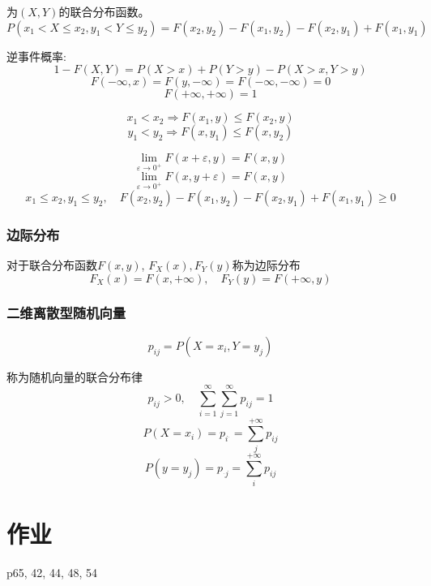 \documentclass[10pt, a4paper]{article}
\begin{document}
            为$(X, Y)$的联合分布函数。
            $$P(x_1 < X \leqslant x_2, y_1 < Y \leqslant y_2) = F(x_2, y_2) - F(x_1, y_2) - F(x_2, y_1) + F(x_1, y_1)$$

            逆事件概率:
            $$1 - F(X, Y) = P(X > x) + P(Y > y) - P(X > x, Y > y)$$
            $$F(-\infty, x) = F(y, -\infty) = F(-\infty, -\infty) = 0$$
            $$F(+\infty, +\infty) = 1$$

            $$x_1 < x_2 \Rightarrow F(x_1, y) \leqslant F(x_2, y)$$
            $$y_1 < y_2 \Rightarrow F(x, y_1) \leqslant F(x, y_2)$$

            $$\lim_{\varepsilon \rightarrow 0^+}F(x + \varepsilon, y) = F(x, y)$$
            $$\lim_{\varepsilon \rightarrow 0^+}F(x, y + \varepsilon) = F(x, y)$$
            $$x_1\leqslant x_2, y_1 \leqslant y_2, \quad F(x_2, y_2) - F(x_1, y_2) - F(x_2, y_1) + F(x_1, y_1) \geqslant 0$$
        
        \subsubsection{边际分布}
            对于联合分布函数$F(x, y)$, $F_X(x), F_Y(y)$称为边际分布 
                $$F_X(x) = F(x, +\infty),\quad F_Y(y) = F(+\infty, y)$$
        \subsubsection{二维离散型随机向量}
            $$p_{ij} = P(X = x_i, Y = y_j)$$
            
            称为随机向量的联合分布律
            $$p_{ij} > 0,\quad\sum_{i = 1}^{\infty}\sum_{j = 1}^{\infty}p_{ij} = 1$$
            $$P(X = x_i) = p_{i^{.}} = \sum_{j}^{+\infty}p_{ij}$$
            $$P(y = y_j) = p_{^{.}j} = \sum_{i}^{+\infty}p_{ij}$$

            \newpage 
\section{作业}
p65, 42, 44, 48, 54
        
\end{document}
